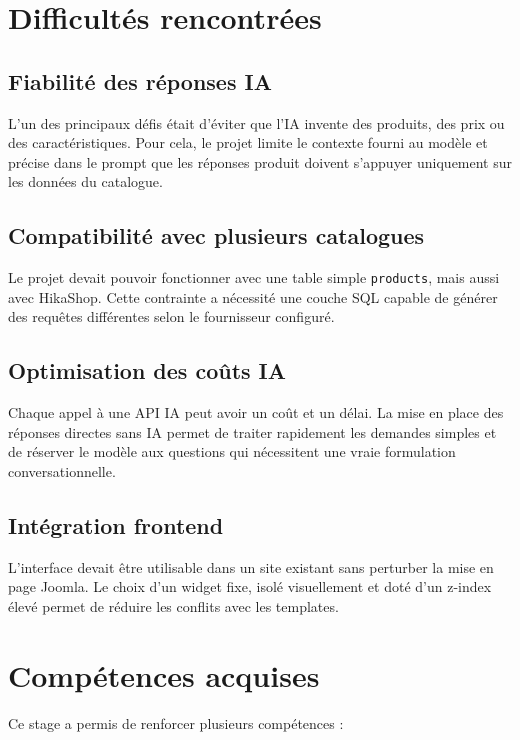 \documentclass[12pt,a4paper]{report}
\begin{document}
\chapter{Difficultés rencontrées}

\section{Fiabilité des réponses IA}

L'un des principaux défis était d'éviter que l'IA invente des produits, des prix ou des caractéristiques. Pour cela, le projet limite le contexte fourni au modèle et précise dans le prompt que les réponses produit doivent s'appuyer uniquement sur les données du catalogue.

\section{Compatibilité avec plusieurs catalogues}

Le projet devait pouvoir fonctionner avec une table simple \texttt{products}, mais aussi avec HikaShop. Cette contrainte a nécessité une couche SQL capable de générer des requêtes différentes selon le fournisseur configuré.

\section{Optimisation des coûts IA}

Chaque appel à une API IA peut avoir un coût et un délai. La mise en place des réponses directes sans IA permet de traiter rapidement les demandes simples et de réserver le modèle aux questions qui nécessitent une vraie formulation conversationnelle.

\section{Intégration frontend}

L'interface devait être utilisable dans un site existant sans perturber la mise en page Joomla. Le choix d'un widget fixe, isolé visuellement et doté d'un z-index élevé permet de réduire les conflits avec les templates.

\chapter{Compétences acquises}

Ce stage a permis de renforcer plusieurs compétences :
\end{document}
